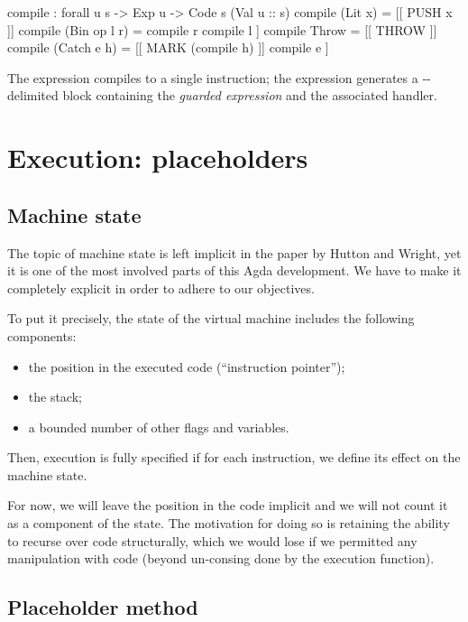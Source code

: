 \label{sec:gmh-ham-compile}\begin{code}
compile : forall {u s} -> Exp u -> Code s (Val u :: s)
compile (Lit x) = [[ PUSH x ]]
compile (Bin op l r) = compile r \app compile l \app [[ opInstr op ]] 
compile Throw = [[ THROW ]]
compile (Catch e h) = [[ MARK (compile h) ]] \app compile e \app [[ UNMARK ]]
\end{code}

The expression  compiles to a single  instruction;
the expression  generates a --delimited
block containing the \emph{guarded expression} and the associated handler.

\section{Execution: placeholders}

\subsection{Machine state}

The topic of machine state is left implicit in the paper by Hutton and Wright,
yet it is one of the most involved parts of this Agda development. We have to
make it completely explicit in order to adhere to our objectives.

To put it precisely, the state of the virtual machine includes
the following components:
\begin{itemize}
	\item the position in the executed code (``instruction pointer'');
	\item the stack;
	\item a bounded number of other flags and variables.
\end{itemize}

Then, execution is fully specified if for each instruction, we define its
effect on the machine state.

For now, we will leave the position in the code implicit and we will not count
it as a component of the state. The motivation for doing so is retaining
the ability to recurse over code structurally, which we would lose if we
permitted any manipulation with code (beyond un-consing done by the execution
function).

\subsection{Placeholder method}

